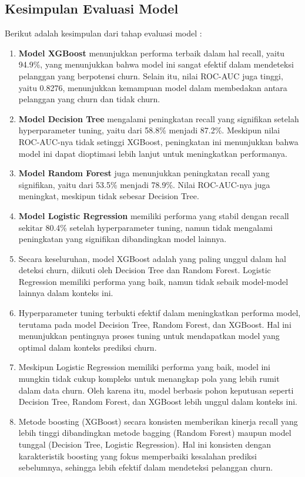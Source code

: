 \subsection{Kesimpulan Evaluasi Model}
Berikut adalah kesimpulan dari tahap evaluasi model :
\begin{enumerate}
    \item \textbf{Model XGBoost} menunjukkan performa terbaik dalam hal recall, yaitu 94.9\%, yang menunjukkan bahwa model ini sangat efektif dalam mendeteksi pelanggan yang berpotensi churn. Selain itu, nilai ROC-AUC juga tinggi, yaitu 0.8276, menunjukkan kemampuan model dalam membedakan antara pelanggan yang churn dan tidak churn.
    \item \textbf{Model Decision Tree} mengalami peningkatan recall yang signifikan setelah hyperparameter tuning, yaitu dari 58.8\% menjadi 87.2\%. Meskipun nilai ROC-AUC-nya tidak setinggi XGBoost, peningkatan ini menunjukkan bahwa model ini dapat dioptimasi lebih lanjut untuk meningkatkan performanya.
    \item \textbf{Model Random Forest} juga menunjukkan peningkatan recall yang signifikan, yaitu dari 53.5\% menjadi 78.9\%. Nilai ROC-AUC-nya juga meningkat, meskipun tidak sebesar Decision Tree.
    \item \textbf{Model Logistic Regression} memiliki performa yang stabil dengan recall sekitar 80.4\% setelah hyperparameter tuning, namun tidak mengalami peningkatan yang signifikan dibandingkan model lainnya.
    \item Secara keseluruhan, model XGBoost adalah yang paling unggul dalam hal deteksi churn, diikuti oleh Decision Tree dan Random Forest. Logistic Regression memiliki performa yang baik, namun tidak sebaik model-model lainnya dalam konteks ini.
    \item Hyperparameter tuning terbukti efektif dalam meningkatkan performa model, terutama pada model Decision Tree, Random Forest, dan XGBoost. Hal ini menunjukkan pentingnya proses tuning untuk mendapatkan model yang optimal dalam konteks prediksi churn.
    \item Meskipun Logistic Regression memiliki performa yang baik, model ini mungkin tidak cukup kompleks untuk menangkap pola yang lebih rumit dalam data churn. Oleh karena itu, model berbasis pohon keputusan seperti Decision Tree, Random Forest, dan XGBoost lebih unggul dalam konteks ini.
    \item Metode boosting (XGBoost) secara konsisten memberikan kinerja recall yang lebih tinggi dibandingkan metode bagging (Random Forest) maupun model tunggal (Decision Tree, Logistic Regression). Hal ini konsisten dengan karakteristik boosting yang fokus memperbaiki kesalahan prediksi sebelumnya, sehingga lebih efektif dalam mendeteksi pelanggan churn.
\end{enumerate}

